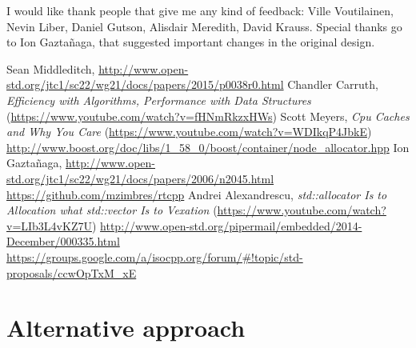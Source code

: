 \documentclass[11pt]{article}
\begin{document}
I would like thank people that give me any kind of feedback: Ville Voutilainen,
Nevin Liber, Daniel Gutson, Alisdair Meredith, David Krauss. Special thanks go
to Ion Gaztañaga, that suggested important changes in the original design.

\begin{thebibliography}{9}

   Sean Middleditch, \url{http://www.open-std.org/jtc1/sc22/wg21/docs/papers/2015/p0038r0.html}
   Chandler Carruth, {\it Efficiency with Algorithms, Performance
  with Data Structures} (\url{https://www.youtube.com/watch?v=fHNmRkzxHWs})
   Scott Meyers, {\it Cpu Caches and Why You Care} (\url{https://www.youtube.com/watch?v=WDIkqP4JbkE})
   \url{http://www.boost.org/doc/libs/1_58_0/boost/container/node_allocator.hpp}
   Ion Gazta\~ naga, \url{http://www.open-std.org/jtc1/sc22/wg21/docs/papers/2006/n2045.html}
   \url{https://github.com/mzimbres/rtcpp}
   Andrei Alexandrescu, {\it std::allocator Is to Allocation what
  std::vector Is to Vexation} (\url{https://www.youtube.com/watch?v=LIb3L4vKZ7U})
   \url{http://www.open-std.org/pipermail/embedded/2014-December/000335.html}
   \url{https://groups.google.com/a/isocpp.org/forum/#!topic/std-proposals/ccwOpTxM_xE}

\end{thebibliography}

\appendix

\section{Alternative approach} \label{alternative}
\end{document}
